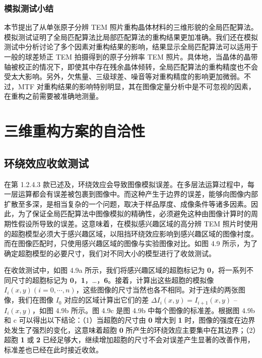  \subsubsection{模拟测试小结}
 本节提出了从单张原子分辨 TEM 照片重构晶体材料的三维形貌的全局匹配算法。模拟测试证明了全局匹配算法比局部匹配算法的重构结果更加准确。我们还在模拟测试中分析讨论了多个因素对重构结果的影响，结果显示全局匹配算法可以适用于一般的球差矫正 TEM 拍摄得到的原子分辨率 TEM 照片。具体地，当晶体的晶带轴被校正的情况下，即使其中存在残余晶体倾转，全局匹配算法的重构精度也不会受太大影响。另外，欠焦量、三级球差、噪音等对重构精度的影响更加微弱。不过，MTF 对重构结果的影响特别明显，其在图像定量分析中是不可忽视的因素，在重构之前需要被准确地测量。

\section{三维重构方案的自洽性}
\subsection{环绕效应收敛测试}
在第 1.2.4.3 款已述及，环绕效应会导致图像模拟误差。在多层法运算过程中，每一层运算都会有误差被包裹到图像中。而这种产生于边界的误差，能够向图像内部扩散至多深，是相当复杂的一个问题，取决于样品厚度、成像条件等诸多因素。因此，为了保证全局匹配算法中图像模拟的精确性，必须避免这种由图像计算时的周期性假设所导致的误差。这意味着，在模拟感兴趣区域的高分辨 TEM 照片时使用的超胞模型必须大于感兴趣区域，以阻挡环绕效应影响到感兴趣区域的图像衬度。而在图像匹配时，只使用感兴趣区域的图像与实验图像对比。如图 4.9 所示，为了确定超胞模型的必要尺寸，我们对不同大小的模型进行了收敛测试。

在收敛测试中，如图 4.9a 所示，我们将感兴趣区域的超胞标记为 \textbf{0}，将一系列不同尺寸的超胞标记为 \textbf{0}，\textbf{1}，…，\textbf{6}。接着，计算出这些超胞的模拟像 $I_i(x, y)(i = 0,\cdots, n)$，这些图像的尺寸当然也各不相同。对于连续的两张图像，我们在图像 $I_0$ 对应的区域计算出它们的差 $\Delta I_i(x, y) = I_{i+1}(x, y)$ – $I_i(x, y)$，如图 4.9b 所示。图 4.9c 是图 4.9b 中每个图像的标准差。根据图 4.9b 和 c 可以得出以下结论：（1）当超胞的尺寸由 \textbf{0} 增大到 \textbf{1} 时，图像的强度在边界处发生了强烈的变化，这意味着超胞 \textbf{0} 所产生的环绕效应主要集中在其边界；（2）超胞 \textbf{1} 或 \textbf{2} 已经足够大，继续增加超胞的尺寸不会对误差产生显著的改善作用，标准差也已经在此时接近收敛。


